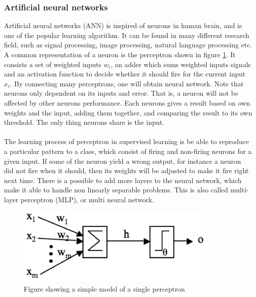 \documentclass[USenglish]{ifimaster}  %
\begin{document}
\subsubsection{Artificial neural networks}
Artificial neural networks (ANN) is inspired of neurons in human brain, and is one of the popular learning algorithm. It can be found in many different research field, such as signal processing, image processing, natural language processing etc. A common representation of a neuron is the perceptron shown in figure \ref{fig:NN}. It consists a set of weighted inputs $w_i$, an adder which sums weighted inputs signals and an activation function to decide whether it should fire for the current input $x_i$. By connecting many perceptrons, one will obtain neural network. Note that neurons only dependent on its inputs and error. That is, a neuron will not be affected by other neurons performance. Each neurons gives a result based on own weights and the input, adding them together, and comparing the result to its own threshold. The only thing neurons share is the input. 
\\
\\
The learning process of perceptron in supervised learning is be able to reproduce a particular pattern to a class, which consist of firing and non-firing neurons for a given input. If some of the neuron yield a wrong output, for instance a neuron did not fire when it should, then its weights will be adjusted to make it fire right next time. There is a possible to add more layers to the neural network, which make it able to handle non linearly separable problems. This is also called multi-layer perceptron (MLP), or multi neural network.

	
\begin{figure}[h]
	\centering
	\includegraphics[scale=0.9]{Figures/neuron.PNG}
	\caption{Figure showing a simple model of a single perceptron \cite{Marsland:2009:MLA:1571643}}
	\label{fig:NN}
\end{figure}
	
\end{document}
